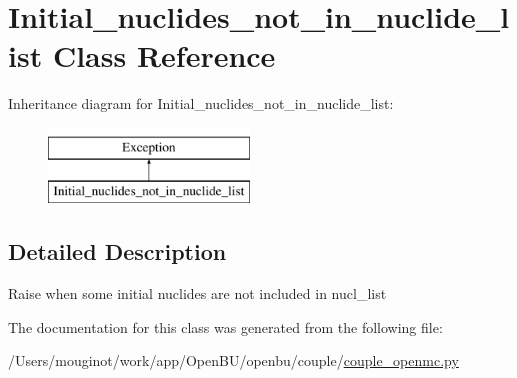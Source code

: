 \hypertarget{classopenbu_1_1couple_1_1couple__openmc_1_1_initial__nuclides__not__in__nuclide__list}{}\section{Initial\+\_\+nuclides\+\_\+not\+\_\+in\+\_\+nuclide\+\_\+list Class Reference}
\label{classopenbu_1_1couple_1_1couple__openmc_1_1_initial__nuclides__not__in__nuclide__list}
Inheritance diagram for Initial\+\_\+nuclides\+\_\+not\+\_\+in\+\_\+nuclide\+\_\+list\+:\begin{figure}[H]
\begin{center}
\leavevmode
\includegraphics[height=2.000000cm]{classopenbu_1_1couple_1_1couple__openmc_1_1_initial__nuclides__not__in__nuclide__list}
\end{center}
\end{figure}


\subsection{Detailed Description}
\begin{DoxyVerb}Raise when some initial nuclides are not included in nucl_list \end{DoxyVerb}
 

The documentation for this class was generated from the following file\+:\begin{DoxyCompactItemize}
\item 
/\+Users/mouginot/work/app/\+Open\+B\+U/openbu/couple/\mbox{\hyperlink{couple__openmc_8py}{couple\+\_\+openmc.\+py}}\end{DoxyCompactItemize}
